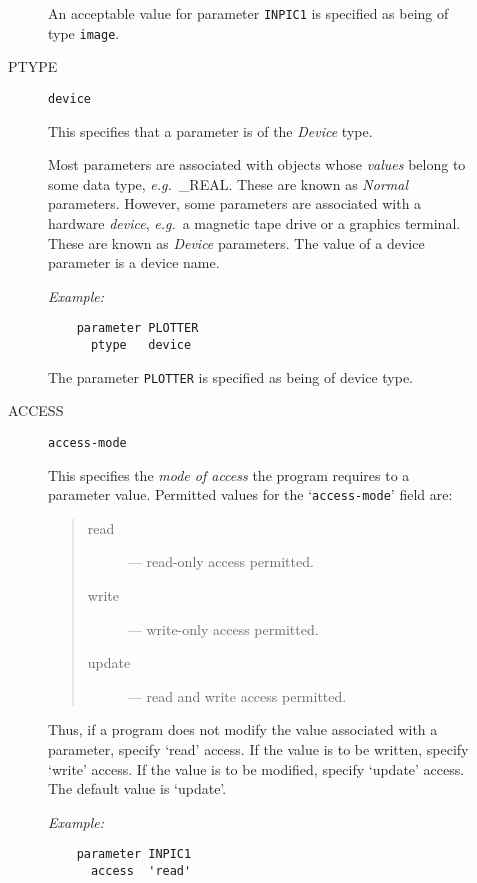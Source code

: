 \begin{description}
\begin{description}
An acceptable value for parameter \verb+INPIC1+ is specified as being of type
\verb+image+.

\item [PTYPE] {\tt device}

This specifies that a parameter is of the {\em Device} type.

Most parameters are associated with objects whose {\em values} belong to some
data type, {\em e.g.}\, \_REAL.
These are known as {\em Normal} parameters.
However, some parameters are associated with a hardware {\em device},
{\em e.g.}\, a magnetic tape drive or a graphics terminal.
These are known as {\em Device} parameters.
The value of a device parameter is a device name.

{\em Example:}

\begin{small}
\begin{verbatim}
    parameter PLOTTER
      ptype   device
\end{verbatim}
\end{small}

The parameter \verb+PLOTTER+ is specified as being of device type.

\item [ACCESS] {\tt access-mode}

This specifies the {\em mode of access} the program requires to a parameter
value.
Permitted values for the `\verb+access-mode+' field are:
\begin{quote}
\begin{description}
\item [read] --- read-only access permitted.
\item [write] --- write-only access permitted.
\item [update] --- read and write access permitted.
\end{description}
\end{quote}
Thus, if a program does not modify the value associated with a parameter,
specify `read' access.
If the value is to be written, specify `write' access.
If the value is to be modified, specify `update' access.
The default value is `update'.

{\em Example:}

\begin{small}
\begin{verbatim}
    parameter INPIC1
      access  'read'
\end{verbatim}
\end{small}


\end{description}
\end{description}
